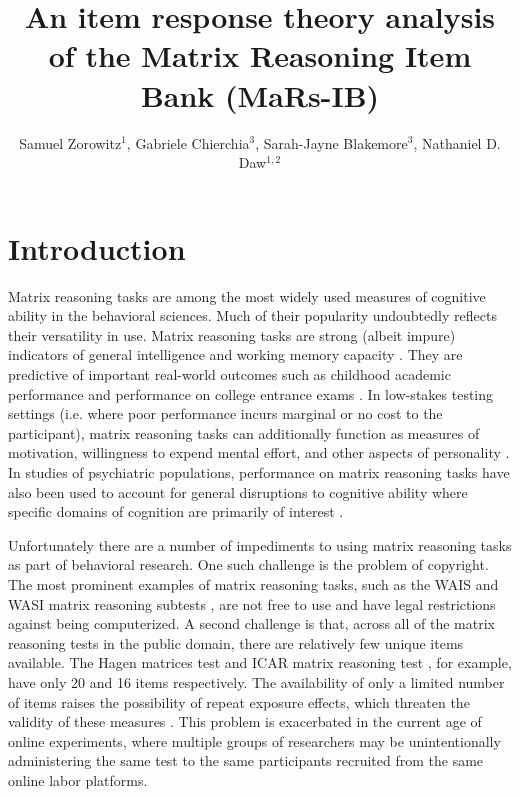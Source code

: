 \documentclass[a4paper,man,natbib]{apa6}
\title{An item response theory analysis of the Matrix Reasoning Item Bank (MaRs-IB)}
\author{Samuel Zorowitz$^1$, Gabriele Chierchia$^3$, Sarah-Jayne Blakemore$^3$, Nathaniel D. Daw$^{1,2}$}
\affiliation{$^1$Princeton Neuroscience Institute, Princeton University, USA\\$^2$Department of Psychology, Princeton University, USA\\$^3$Department of Psychology, University of Cambridge, Downing Street, Cambridge, UK}
\begin{document}
\maketitle

\section{Introduction}

Matrix reasoning tasks are among the most widely used measures of cognitive ability in the behavioral sciences. Much of their popularity undoubtedly reflects their versatility in use. Matrix reasoning tasks are strong (albeit impure) indicators of general intelligence \citep{gignac2015raven} and working memory capacity \citep{kane2004generality, unsworth2005working}. They are predictive of important real-world outcomes such as childhood academic performance \citep{roth2015intelligence} and performance on college entrance exams \citep{frey2004scholastic, koenig2008act}. In low-stakes testing settings (i.e. where poor performance incurs marginal or no cost to the participant), matrix reasoning tasks can additionally function as measures of motivation, willingness to expend mental effort, and other aspects of personality \citep{duckworth2011role, gignac2019maximum}. In studies of psychiatric populations, performance on matrix reasoning tasks have also been used to account for general disruptions to cognitive ability where specific domains of cognition are primarily of interest \citep{gillan2016characterizing, rouault2018psychiatric, moutoussis2021decision}.

Unfortunately there are a number of impediments to using matrix reasoning tasks as part of behavioral research. One such challenge is the problem of copyright. The most prominent examples of matrix reasoning tasks, such as the WAIS and WASI matrix reasoning subtests \citep{wechsler1999wechsler, corporation2008wechsler}, are not free to use and have legal restrictions against being computerized. A second challenge is that, across all of the matrix reasoning tests in the public domain, there are relatively few unique items available. The Hagen matrices test \citep{heydasch2014hagen} and ICAR matrix reasoning test \citep{condon2014international}, for example, have only 20 and 16 items respectively. The availability of only a limited number of items raises the possibility of repeat exposure effects, which threaten the validity of these measures  \citep{ng1974applicability, bors2003effect}. This problem is exacerbated in the current age of online experiments, where multiple groups of researchers may be unintentionally administering the same test to the same participants recruited from the same online labor platforms.
\end{document}

